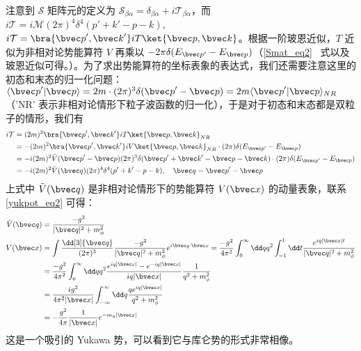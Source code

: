 注意到 $\mathcal{S}$ 矩阵元的定义为 $\mathcal{S}_{\beta\alpha}=\delta_{\beta\alpha}+i\mathcal{T}_{\beta\alpha}$，而 $i\mathcal{T}=i\mathcal{M}(2\pi)^4 \delta^4(p'+k'-p-k)$, $i\mathcal{T} = \bra{{\bvec p}',{\bvec k}'}iT\ket{{\bvec p},{\bvec k}}$。根据一阶玻恩近似，$T$ 近似为非相对论势能算符 $V$ 再乘以 $-2\pi\delta(E_{\bvec p'}-E_{\bvec p})$（\autoref{Smat_eq2}~ 式以及玻恩近似可得。）。为了求出势能算符的坐标表象的表达式，我们还需要注意这里的初态和末态的归一化问题：$\langle{\bvec p}'|{\bvec p}\rangle=2m\cdot (2\pi)^3 \delta({\bvec p}'-{\bvec p}) = 2m \langle{\bvec p}'|{\bvec p}\rangle_{NR}$（'NR' 表示非相对论情形下粒子波函数的归一化），于是对于初态和末态都是双粒子的情形，我们有
\begin{equation}
\begin{aligned} 
i\mathcal{T}&=(2m)^2\bra{{\bvec p}',{\bvec k}'}iT\ket{{\bvec p},{\bvec k}}_{NR}\\
& =-(2m)^2\bra{{\bvec p}',{\bvec k}'}iV\ket{{\bvec p},{\bvec k}}_{NR} \cdot (2\pi) \delta(E_{{\bvec p}'}-E_{\bvec p})
\\
& = -i(2m)^2 \tilde{V}({\bvec p}'-{\bvec p})(2\pi)^3 \delta({\bvec p}'+{\bvec k}'-{\bvec p}-{\bvec k})\cdot (2\pi) \delta(E_{{\bvec p}'}-E_{\bvec p})\\
&=-i(2m)^2 \tilde{V}(\bvec q) (2\pi)^4 \delta^4(p'+k'-p-k),\quad \bvec q={\bvec p}'-{\bvec p}
\end{aligned}
\end{equation}
上式中 $\tilde V(\bvec q)$ 是非相对论情形下的势能算符 $V(\bvec x)$ 的动量表象，联系\autoref{yukpot_eq2} 可得：
\begin{equation}
\begin{aligned}
\tilde{V}(\bvec q)&=\frac{-g^2}{|\bvec q|^2+m_\phi^2}\\
V({\bvec x})&=\int \frac{\dd[3]{\bvec q}}{(2\pi)^3} \frac{-g^2}{|\bvec q|^2+m_\phi^2}e^{i\bvec q\cdot {\bvec x}} =\frac{-g^2}{4\pi^2}\int_0^\infty \dd q q^2\int_{-1}^1 \dd t \frac{e^{iq|{\bvec x}|t}}{|\bvec q|^2+m_\phi^2}\\
&= \frac{-g^2}{4\pi^2}\int_0^\infty \dd q q^2\frac{e^{iq|{\bvec x}|}-e^{-iq|{\bvec x}|}}{iq|{\bvec x}|} \frac{1}{q^2+m_\phi^2}\\
&=\frac{ig^2}{4\pi^2|{\bvec x}|}\int_{-\infty}^\infty \dd q \frac{qe^{iq|{\bvec x}|}}{q^2+m_\phi^2}\\
&=-\frac{g^2}{4\pi}\frac{1}{|{\bvec x}|} e^{-m_\phi |{\bvec x}|}
\end{aligned}
\end{equation}
这是一个吸引的 Yukawa 势，可以看到它与库仑势的形式非常相像。
